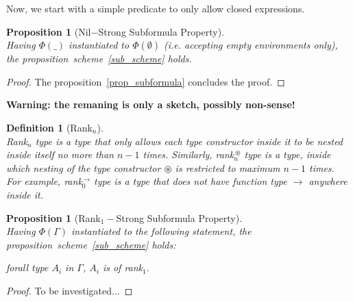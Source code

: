 \documentclass[a4paper]{article}
\newcommand{\typecolor}{}
\newcommand{\tp}[1]{{\typecolor #1}}
\newtheorem{proposition}[theorem]{Proposition}
\newtheorem{definition}{Definition}
\newcommand{\typarr}[2]{#1\boldsymbol{\rightarrow}#2}
\newcommand{\envemp}{\tp{\boldsymbol{\emptyset}}}
\begin{document}
Now, we start with a simple predicate to only allow closed expressions.
 
\begin{proposition}[Nil$-$Strong Subformula Property]\ \\
Having $\Phi(\_)$ instantiated to $\Phi(\envemp)$ (i.e. accepting empty environments only), the
proposition~scheme~\ref{sub_scheme} holds.
\end{proposition}
\begin{proof}
The proposition~\ref{prop_subformula} concludes the proof.
\end{proof}

\textbf{Warning: the remaning is only a sketch, possibly non-sense!}

\begin{definition}[Rank$_n$]\ \\
Rank$_n$ type is a type that only allows each type constructor inside
it to be nested inside itself no more than $n - 1$ times. Similarly,
rank$_{n}^{\,\circledast}$ type is a type, inside which nesting of the
type constructor $\circledast$ is restricted to maximum $n - 1$ times.
For example, rank$_{0}^{\,\typarr{}{}}$ type is a type that does not have
function type $\typarr{}{}$ anywhere inside it.
\end{definition}

\begin{proposition}[Rank$_{1}-$Strong Subformula Property]\ \\
Having $\Phi(\Gamma)$ instantiated to the following statement, the
proposition~scheme~\ref{sub_scheme} holds:
 
 forall type $A_i$ in $\Gamma$, $A_i$ is of rank$_{1}$.
 
\end{proposition}
\begin{proof}
To be investigated...
\end{proof}

 
\end{document}
